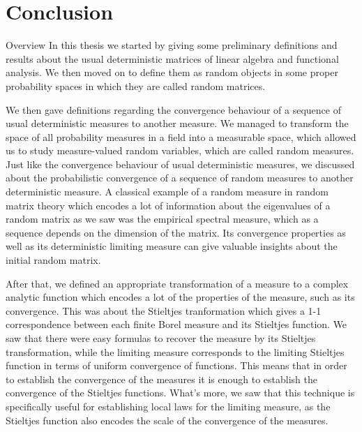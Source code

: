 \documentclass[11pt, a4paper, oneside]{book}
\numberwithin{equation}{chapter}
\begin{document}
\chapter{Conclusion}

\begin{section}{Overview}
In this thesis we started by giving some preliminary definitions and results about the usual deterministic matrices of linear algebra and functional analysis. We then moved on to define them as random objects in some proper probability spaces in which they are called random matrices.

We then gave definitions regarding the convergence behaviour of a sequence of usual deterministic measures to another measure. We managed to transform the space of all probability measures in a field into a measurable space, which allowed us to study measure-valued random variables, which are called random measures. Just like the convergence behaviour of usual deterministic measures, we discussed about the probabilistic convergence of a sequence of random measures to another deterministic measure. A classical example of a random measure in random matrix theory which encodes a lot of information about the eigenvalues of a random matrix as we saw was the empirical spectral measure, which as a sequence depends on the dimension of the matrix. Its convergence properties as well as its deterministic limiting measure can give valuable insights about the initial random matrix.
\newpage

After that, we defined an appropriate transformation of a measure to a complex analytic function which encodes a lot of the properties of the measure, such as its convergence. This was about the Stieltjes tranformation which gives a 1-1 correspondence between each finite Borel measure and its Stieltjes function. We saw that there were easy formulas to recover the measure by its Stieltjes transformation, while the limiting measure corresponds to the limiting Stieltjes function in terms of uniform convergence of functions. This means that in order to establish the convergence of the measures it is enough to establish the convergence of the Stieltjes functions. What's more, we saw that this technique is specifically useful for establishing local laws for the limiting measure, as the Stieltjes function also encodes the scale of the convergence of the measures.


\end{section}
\end{document}
